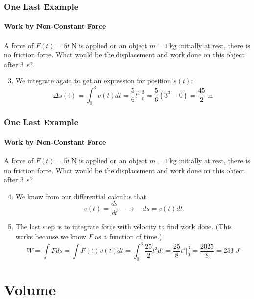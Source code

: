 \documentclass[12pt,compress,aspectratio=169]{beamer}
\begin{document}
\begin{frame}
  \frametitle{One Last Example}
  \framesubtitle{Work by Non-Constant Force}

  A force of $F(t)=5t\;\si{\N}$ is applied on an object $m=\SI{1}{\kg}$ initially
  at rest, there is no friction force. What would be the displacement and work
  done on this object after \SI{3}{\s}?

  \begin{enumerate}
    \setcounter{enumi}{2}
  \item We integrate again to get an expression for position $s(t)$:
    \begin{displaymath}
      \Delta s(t)=\int_0^3 v(t)dt=\frac{5}{6}t^3\Big|_0^3
      =\frac{5}{6}\left(3^3-0\right)=\frac{45}{2}\;\si{\metre}
    \end{displaymath}
  \end{enumerate}
\end{frame}

\begin{frame}
  \frametitle{One Last Example}
  \framesubtitle{Work by Non-Constant Force}

  A force of $F(t)=5t\;\si{\N}$ is applied on an object $m=\SI{1}{\kg}$
  initially at rest, there is no friction force. What would be the displacement
  and work done on this object after \SI{3}{\s}?

  \begin{enumerate}
    \setcounter{enumi}{3}
  \item We know from our differential calculus that
    \begin{displaymath}
      v(t)=\frac{ds}{dt}\quad\longrightarrow\quad ds=v(t)dt
    \end{displaymath}
  \item The last step is to integrate force with velocity to find work done.
    (This works because we know $F$ as a function of time.)
    \begin{displaymath}
      W=\int Fds=\int F(t)v(t)dt =\int_0^3\frac{25}{2}t^3dt=\frac{25}{8}t^4\Big|^3_0
      =\frac{2025}{8}=\boxed{253\;\si{J}}
    \end{displaymath}
  \end{enumerate}
\end{frame}

\section{Volume}
\end{document}
